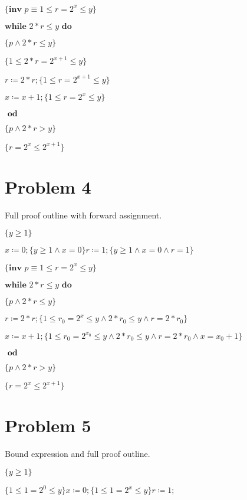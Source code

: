 \documentclass{article}
\begin{document}
$\{\textbf{inv }p \equiv 1 \leq r=2^x \leq y \}$

$ \textbf{while } 2*r \leq y \textbf{ do }$

\qquad \qquad $\{p \wedge 2*r \leq y \}$

\qquad \qquad $\{1 \leq 2*r=2^{x+1} \leq y \}$

\qquad \qquad $r \coloneqq 2*r;\{1 \leq r=2^{x+1} \leq y\}$

\qquad \qquad $x \coloneqq x+1;\{1 \leq r=2^x \leq y \}$

$ \textbf { od}$

$ \{p \wedge 2*r > y \}$

$ \{r=2^x \leq 2^{x+1} \}$


\section*{Problem 4}

Full proof outline with forward assignment.

\vspace{10pt}

$ \{y \geq 1\} $

$ x \coloneqq0;\{y \geq 1 \wedge x=0\} r \coloneqq 1; \{y \geq 1 \wedge x=0 \wedge r=1\}$

$\{\textbf{inv }p \equiv 1 \leq r=2^x \leq y \}$

$ \textbf{while } 2*r \leq y \textbf{ do }$

\qquad \qquad $\{p \wedge 2*r \leq y \}$

\qquad \qquad $r \coloneqq 2*r;\{1 \leq r_0=2^x \leq y \wedge 2*r_0 \leq y \wedge r=2*r_0 \}$

\qquad \qquad $x \coloneqq x+1;\{1 \leq r_0=2^{x_0} \leq y \wedge 2*r_0 \leq y \wedge r=2*r_0 \wedge x=x_0+1 \}$

$ \textbf { od}$

$ \{p \wedge 2*r > y \}$

$ \{r=2^x \leq 2^{x+1} \}$


\section*{Problem 5}

Bound expression and full proof outline.

\vspace{10pt}

$ \{y \geq 1\} $

$ \{1 \leq 1=2^0 \leq y\} x \coloneqq0;\{1 \leq 1=2^x \leq y\} r \coloneqq 1; $
\end{document}
